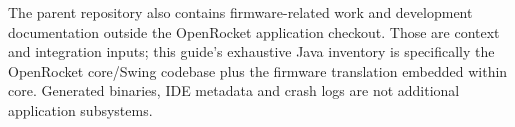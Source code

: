 The parent repository also contains firmware-related work and development documentation outside the OpenRocket application checkout. Those are context and integration inputs; this guide's exhaustive Java inventory is specifically the OpenRocket core/Swing codebase plus the firmware translation embedded within core. Generated binaries, IDE metadata and crash logs are not additional application subsystems.
